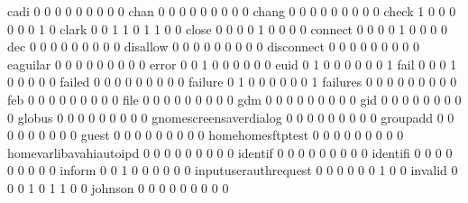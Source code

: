 \documentclass[compress,8pt]{beamer}
\begin{document}
\begin{frame}
\begin{Schunk}
  cadi                                       0   0   0   0   0   0   0   0   0
  chan                                       0   0   0   0   0   0   0   0   0
  chang                                      0   0   0   0   0   0   0   0   0
  check                                      1   0   0   0   0   0   0   1   0
  clark                                      0   0   1   1   0   1   1   0   0
  close                                      0   0   0   0   1   0   0   0   0
  connect                                    0   0   0   0   1   0   0   0   0
  dec                                        0   0   0   0   0   0   0   0   0
  disallow                                   0   0   0   0   0   0   0   0   0
  disconnect                                 0   0   0   0   0   0   0   0   0
  eaguilar                                   0   0   0   0   0   0   0   0   0
  error                                      0   0   1   0   0   0   0   0   0
  euid                                       0   1   0   0   0   0   0   0   1
  fail                                       0   0   0   1   0   0   0   0   0
  failed                                     0   0   0   0   0   0   0   0   0
  failure                                    0   1   0   0   0   0   0   0   1
  failures                                   0   0   0   0   0   0   0   0   0
  feb                                        0   0   0   0   0   0   0   0   0
  file                                       0   0   0   0   0   0   0   0   0
  gdm                                        0   0   0   0   0   0   0   0   0
  gid                                        0   0   0   0   0   0   0   0   0
  globus                                     0   0   0   0   0   0   0   0   0
  gnomescreensaverdialog                     0   0   0   0   0   0   0   0   0
  groupadd                                   0   0   0   0   0   0   0   0   0
  guest                                      0   0   0   0   0   0   0   0   0
  homehomesftptest                           0   0   0   0   0   0   0   0   0
  homevarlibavahiautoipd                     0   0   0   0   0   0   0   0   0
  identif                                    0   0   0   0   0   0   0   0   0
  identifi                                   0   0   0   0   0   0   0   0   0
  inform                                     0   0   1   0   0   0   0   0   0
  inputuserauthrequest                       0   0   0   0   0   0   1   0   0
  invalid                                    0   0   0   1   0   1   1   0   0
  johnson                                    0   0   0   0   0   0   0   0   0

\end{Schunk}
\end{frame}
\end{document}
